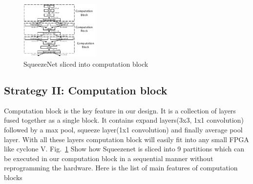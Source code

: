 \documentclass[conference]{IEEEtran}
\begin{document}
\begin{figure}[htbp]
\centerline{\includegraphics[width=0.35\textwidth]{squz.pdf}}
\caption{SqueezeNet sliced into computation block}
\label{sqz}
\end{figure}
\subsection{Strategy II: Computation block}
Computation block is the key feature in our design. It is a collection of layers fused together as a single block. It contains expand layers(3x3, 1x1 convolution) followed by a max pool, squeeze layer(1x1 convolution) and finally average pool layer. With all these layers computation block will easily fit into any small FPGA like cyclone V. Fig.~\ref{sqz} Show how Squeezenet is sliced into 9 partitions which can be executed in our computation block in a sequential manner without reprogramming the hardware. Here is the list of main features of computation blocks
\end{document}
